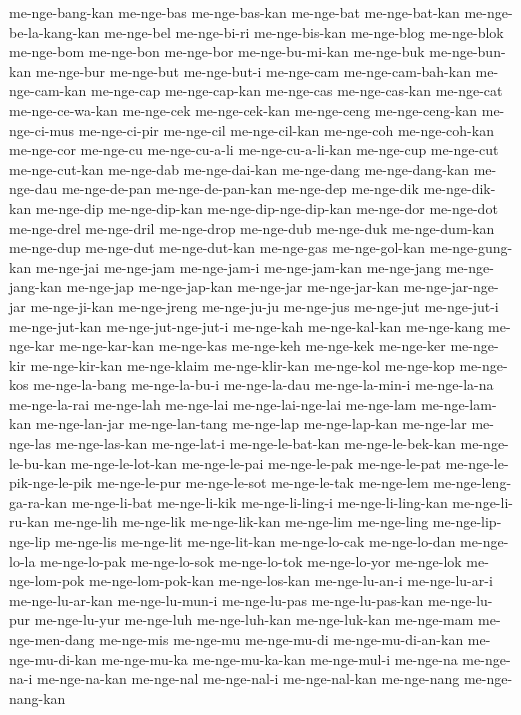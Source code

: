 {me-nge-bang-kan me-nge-bas me-nge-bas-kan me-nge-bat me-nge-bat-kan
me-nge-be-la-kang-kan me-nge-bel me-nge-bi-ri me-nge-bis-kan me-nge-blog
me-nge-blok me-nge-bom me-nge-bon me-nge-bor me-nge-bu-mi-kan me-nge-buk
me-nge-bun-kan me-nge-bur me-nge-but me-nge-but-i me-nge-cam
me-nge-cam-bah-kan me-nge-cam-kan me-nge-cap me-nge-cap-kan me-nge-cas
me-nge-cas-kan me-nge-cat me-nge-ce-wa-kan me-nge-cek me-nge-cek-kan
me-nge-ceng me-nge-ceng-kan me-nge-ci-mus me-nge-ci-pir me-nge-cil
me-nge-cil-kan me-nge-coh me-nge-coh-kan me-nge-cor me-nge-cu
me-nge-cu-a-li me-nge-cu-a-li-kan me-nge-cup me-nge-cut me-nge-cut-kan
me-nge-dab me-nge-dai-kan me-nge-dang me-nge-dang-kan me-nge-dau
me-nge-de-pan me-nge-de-pan-kan me-nge-dep me-nge-dik me-nge-dik-kan
me-nge-dip me-nge-dip-kan me-nge-dip-nge-dip-kan me-nge-dor me-nge-dot
me-nge-drel me-nge-dril me-nge-drop me-nge-dub me-nge-duk me-nge-dum-kan
me-nge-dup me-nge-dut me-nge-dut-kan me-nge-gas me-nge-gol-kan
me-nge-gung-kan me-nge-jai me-nge-jam me-nge-jam-i me-nge-jam-kan
me-nge-jang me-nge-jang-kan me-nge-jap me-nge-jap-kan me-nge-jar
me-nge-jar-kan me-nge-jar-nge-jar me-nge-ji-kan me-nge-jreng me-nge-ju-ju
me-nge-jus me-nge-jut me-nge-jut-i me-nge-jut-kan me-nge-jut-nge-jut-i
me-nge-kah me-nge-kal-kan me-nge-kang me-nge-kar me-nge-kar-kan me-nge-kas
me-nge-keh me-nge-kek me-nge-ker me-nge-kir me-nge-kir-kan me-nge-klaim
me-nge-klir-kan me-nge-kol me-nge-kop me-nge-kos me-nge-la-bang
me-nge-la-bu-i me-nge-la-dau me-nge-la-min-i me-nge-la-na me-nge-la-rai
me-nge-lah me-nge-lai me-nge-lai-nge-lai me-nge-lam me-nge-lam-kan
me-nge-lan-jar me-nge-lan-tang me-nge-lap me-nge-lap-kan me-nge-lar
me-nge-las me-nge-las-kan me-nge-lat-i me-nge-le-bat-kan me-nge-le-bek-kan
me-nge-le-bu-kan me-nge-le-lot-kan me-nge-le-pai me-nge-le-pak
me-nge-le-pat me-nge-le-pik-nge-le-pik me-nge-le-pur me-nge-le-sot
me-nge-le-tak me-nge-lem me-nge-leng-ga-ra-kan me-nge-li-bat me-nge-li-kik
me-nge-li-ling-i me-nge-li-ling-kan me-nge-li-ru-kan me-nge-lih me-nge-lik
me-nge-lik-kan me-nge-lim me-nge-ling me-nge-lip-nge-lip me-nge-lis
me-nge-lit me-nge-lit-kan me-nge-lo-cak me-nge-lo-dan me-nge-lo-la
me-nge-lo-pak me-nge-lo-sok me-nge-lo-tok me-nge-lo-yor me-nge-lok
me-nge-lom-pok me-nge-lom-pok-kan me-nge-los-kan me-nge-lu-an-i
me-nge-lu-ar-i me-nge-lu-ar-kan me-nge-lu-mun-i me-nge-lu-pas
me-nge-lu-pas-kan me-nge-lu-pur me-nge-lu-yur me-nge-luh me-nge-luh-kan
me-nge-luk-kan me-nge-mam me-nge-men-dang me-nge-mis me-nge-mu
me-nge-mu-di me-nge-mu-di-an-kan me-nge-mu-di-kan me-nge-mu-ka
me-nge-mu-ka-kan me-nge-mul-i me-nge-na me-nge-na-i me-nge-na-kan
me-nge-nal me-nge-nal-i me-nge-nal-kan me-nge-nang me-nge-nang-kan
}
